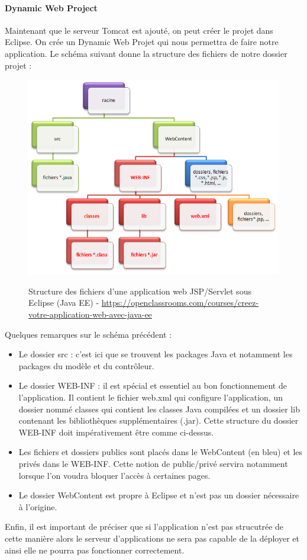 \paragraph{Dynamic Web Project}
Maintenant que le serveur Tomcat est ajouté, on peut créer le projet dans Eclipse. On crée un Dynamic Web Projet qui nous permettra de faire notre application.
Le schéma suivant donne la structure des fichiers de notre dossier projet :\\
\begin{figure}[H]
  \center
  \includegraphics[scale=0.5]{../graph/schemaProjetDynamic.png} \\
  \caption{Structure des fichiers d'une application web JSP/Servlet sous Eclipse (Java EE) - \url{https://openclassrooms.com/courses/creez-votre-application-web-avec-java-ee}}
\end{figure}
Quelques remarques sur le schéma précédent :
\begin{itemize}
 \item Le dossier src : c'est ici que se trouvent les packages Java et notamment les packages du modèle et du contrôleur.
 \item Le dossier WEB-INF : il est spécial et essentiel au bon fonctionnement de l'application. Il contient le fichier web.xml qui configure l'application, un dossier nommé classes qui contient les classes Java compilées et un dossier lib contenant les bibliothèques supplémentaires (.jar). Cette structure du dossier WEB-INF doit impérativement être comme ci-dessus.
 \item Les fichiers et dossiers publics sont placés dans le WebContent (en bleu) et les privés dans le WEB-INF. Cette notion de public/privé servira notamment lorsque l'on voudra bloquer l'accès à certaines pages.
 \item Le dossier WebContent est propre à Eclipse et n'est pas un dossier nécessaire à l'origine.
\end{itemize}
Enfin, il est important de préciser que si l'application n'est pas strucutrée de cette manière alors le serveur d'applications ne sera pas capable de la déployer et ainsi elle ne pourra pas fonctionner correctement.\\


